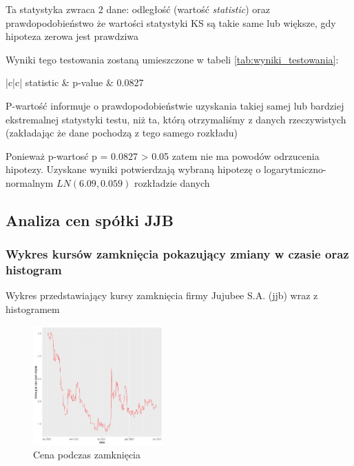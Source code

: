 \documentclass[a4paper,11pt]{article}
\def\\{\hfill\break}
\begin{document}
Ta statystyka zwraca 2 dane: odległość (wartość \textit{statistic}) oraz prawdopodobieństwo że wartości statystyki KS są takie same lub większe, gdy hipoteza zerowa jest prawdziwa

Wyniki tego testowania zostaną umieszczone w tabeli \ref{tab:wyniki_testowania}:

\begin{table}[htb]
  \centering
  \begin{tabular}{|c|c|}
    \hline
     statistic & p-value   \\
      & 0.0827\\
    \hline
  \end{tabular}
  \caption{Wartość statystyki KS w testowaniu hipotezy}
  \label{tab:wyniki_testowania}
\end{table}


P-wartość informuje o prawdopodobieństwie uzyskania takiej samej lub bardziej ekstremalnej statystyki testu, niż ta, którą otrzymaliśmy z danych rzeczywistych (zakładając że dane pochodzą z tego samego rozkładu)

Ponieważ p-wartosć  p = 0.0827 > 0.05 zatem nie ma powodów odrzucenia hipotezy. Uzyskane wyniki potwierdzają wybraną hipotezę  o logarytmiczno-normalnym $LN(6.09, 0.059)$ rozkładzie danych


\subsection{Analiza cen spółki JJB}
\subsubsection{Wykres kursów zamknięcia pokazujący zmiany w czasie oraz histogram}

Wykres przedstawiający kursy zamknięcia firmy Jujubee S.A. (jjb) wraz z histogramem
\begin{figure}[h]
  \includegraphics[width=5cm]{jjb_cena_podczas_zamkn.png}
  \caption{Cena podczas zamknięcia}
  \label{fig:jjb_cena_podcaz_zamkn}
\end{figure}
\end{document}
